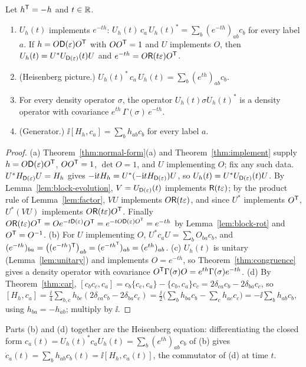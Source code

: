 \begin{theorem}\label{thm:evolution}
Let $h^{\mathsf T}=-h$ and $t\in\mathbb R$.
\begin{enumerate}
\item[(a)] $U_h(t)$ implements $e^{-th}$: $U_h(t)\,c_a\,U_h(t)^*=\sum_b(e^{-th})_{ab}c_b$ for
every label $a$. If $h=O\mathsf D(\varepsilon)O^{\mathsf T}$ with $OO^{\mathsf T}=1$ and $U$ implements $O$, then
$U_h(t)=U^*U_{\mathsf D(\varepsilon)}(t)U$ and $e^{-th}=O\mathsf R(t\varepsilon)O^{\mathsf T}$.
\item[(b)] (Heisenberg picture.) $U_h(t)^*\,c_a\,U_h(t)=\sum_b(e^{th})_{ab}c_b$.
\item[(c)] For every density operator $\sigma$, the operator $U_h(t)\sigma U_h(t)^*$ is a
density operator with covariance $e^{th}\,\Gamma(\sigma)\,e^{-th}$.
\item[(d)] (Generator.) $\ii[H_h,c_a]=\sum_bh_{ab}c_b$ for every label $a$.
\end{enumerate}
\end{theorem}
\begin{proof}
(a) Theorem~\ref{thm:normal-form}(a) and Theorem~\ref{thm:implement} supply
$h=O\mathsf D(\varepsilon)O^{\mathsf T}$, $OO^{\mathsf T}=1$, $\det O=1$, and $U$ implementing $O$; fix any such data.
$U^*H_{\mathsf D(\varepsilon)}U=H_h$ gives $-\mathrm i tH_h=U^*(-\mathrm i tH_{\mathsf D(\varepsilon)})U$, so
$U_h(t)=U^*U_{\mathsf D(\varepsilon)}(t)U$. By Lemma~\ref{lem:block-evolution},
$V=U_{\mathsf D(\varepsilon)}(t)$ implements $\mathsf R(t\varepsilon)$; by the product rule of
Lemma~\ref{lem:factor}, $VU$ implements $O\mathsf R(t\varepsilon)$, and since $U^*$ implements
$O^{\mathsf T}$, $U^*(VU)$ implements $O\mathsf R(t\varepsilon)O^{\mathsf T}$. Finally
$O\mathsf R(t\varepsilon)O^{\mathsf T}=Oe^{-t\mathsf D(\varepsilon)}O^{\mathsf T}=e^{-tO\mathsf D(\varepsilon)O^{\mathsf T}}=e^{-th}$ by
Lemma~\ref{lem:block-rot} and $O^{\mathsf T}=O^{-1}$.
(b) For $U$ implementing $O$, $U^*c_aU=\sum_bO_{ba}c_b$, and
$(e^{-th})_{ba}=\bigl((e^{-th})^{\mathsf T}\bigr)_{ab}=(e^{-th^{\mathsf T}})_{ab}=(e^{th})_{ab}$.
(c) $U_h(t)$ is unitary (Lemma~\ref{lem:unitary}) and implements $O=e^{-th}$, so
Theorem~\ref{thm:congruence} gives a density operator with covariance
$O^{\mathsf T}\Gamma(\sigma)O=e^{th}\Gamma(\sigma)e^{-th}$.
(d) By Theorem~\ref{thm:car},
$[c_bc_c,c_a]=c_b\{c_c,c_a\}-\{c_b,c_a\}c_c=2\delta_{ca}c_b-2\delta_{ba}c_c$, so
$[H_h,c_a]=\tfrac\ii4\sum_{b,c}h_{bc}(2\delta_{ca}c_b-2\delta_{ba}c_c)
=\tfrac\ii2\bigl(\sum_bh_{ba}c_b-\sum_ch_{ac}c_c\bigr)=-\ii\sum_bh_{ab}c_b$,
using $h_{ba}=-h_{ab}$; multiply by $\ii$.
\end{proof}
Parts (b) and (d) together are the Heisenberg equation: differentiating the closed form
$c_a(t)=U_h(t)^*c_aU_h(t)=\sum_b(e^{th})_{ab}c_b$ of (b) gives
$\dot c_a(t)=\sum_bh_{ab}c_b(t)=\ii[H_h,c_a(t)]$, the commutator of (d) at time $t$.

